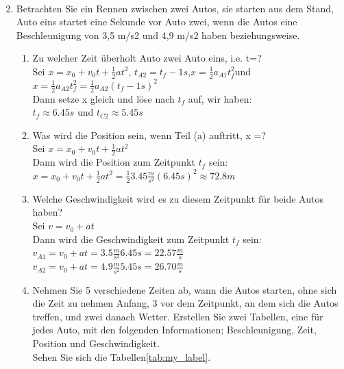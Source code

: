 \documentclass[letterpaper,12pt]{article}
\begin{document}
\begin{enumerate}
\begin{align*}
\end{align*}
 \item {Betrachten Sie ein Rennen zwischen zwei Autos, sie starten aus dem Stand, Auto eins startet eine Sekunde vor Auto zwei, wenn die Autos eine Beschleunigung von 3,5 m/s2 und 4,9 m/s2 haben beziehungsweise.}
    \begin{enumerate}
        \item Zu welcher Zeit überholt Auto zwei Auto eins, i.e. t=?\\
        Sei ${x=x_0+v_0t+\frac{1}{2}at^2}$\hspace{0.5cm}, \hspace{0.5cm}$t_{A2}=t_f-1s$,\hspace{0.5cm}$x=\frac{1}{2}a_{A1}t_f^2$\hspace{0.5cm}und\\$x=\frac{1}{2}a_{A2}t_f^2=\frac{1}{2}a_{A2}(t_f-1s)^2$\\
        Dann setze x gleich und löse nach $t_f$ auf, wir haben:\\$t_{f}\approx6.45s$\hspace{0.2cm} und \hspace{0.2cm}$t_{C2}\approx5.45s$
        
        \item Was wird die Position sein, wenn Teil (a) auftritt, x =?\\
        Sei ${x=x_0+v_0t+\frac{1}{2}at^2}$\\
        Dann wird die Position zum Zeitpunkt $t_f$ sein:\\
        ${x=x_0+v_0t+\frac{1}{2}at^2}=\frac{1}{2}3.45\frac{m}{s^2}(6.45s)^2\approx72.8 m$
        
        \item Welche Geschwindigkeit wird es zu diesem Zeitpunkt für beide Autos haben?\\
        Sei $v=v_0+at$\\
        Dann wird die Geschwindigkeit zum Zeitpunkt $t_f$ sein:\\
        $v_{A1}=v_0+at=3.5\frac{m}{s^2}6.45s=22.57\frac{m}{s}$\\
        $v_{A2}=v_0+at=4.9\frac{m}{s^2}5.45s=26.70\frac{m}{s}$\\
        
        \item Nehmen Sie 5 verschiedene Zeiten ab, wann die Autos starten, ohne sich die Zeit zu nehmen Anfang, 3 vor dem Zeitpunkt, an dem sich die Autos treffen, und zwei danach Wetter. Erstellen Sie zwei Tabellen, eine für jedes Auto, mit den folgenden Informationen; Beschleunigung, Zeit, Position und Geschwindigkeit.\\Sehen Sie sich die Tabellen\ref{tab:my_label}.
    \end{enumerate}


\end{enumerate}
\end{document}

